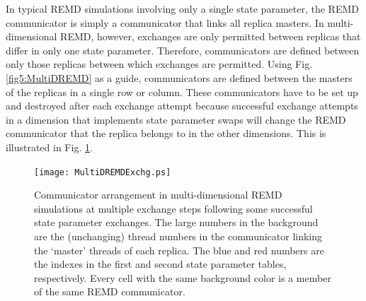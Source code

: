In typical REMD simulations involving only a single state parameter, the REMD
communicator is simply a communicator that links all replica masters. In
multi-dimensional REMD, however, exchanges are only permitted between replicas
that differ in only one state parameter. Therefore, communicators are defined
between only those replicas between which exchanges are permitted. Using Fig.
\ref{fig5:MultiDREMD} as a guide, communicators are defined between the masters
of the replicas in a single row or column. These communicators have to be set up
and destroyed after each exchange attempt because successful exchange attempts
in a dimension that implements state parameter swaps will change the REMD
communicator that the replica belongs to in the other dimensions. This is
illustrated in Fig. \ref{fig5:MultiDREMDExchg}.

\begin{figure}
   \texttt{[image: MultiDREMDExchg.ps]}
   \caption[Communicator arrangement in multi-dimensional REMD simulations at
            multiple exchange steps following some successful state parameter
            exchanges.]
           {Communicator arrangement in multi-dimensional REMD simulations at
            multiple exchange steps following some successful state parameter
            exchanges. The large numbers in the background are the (unchanging)
            thread numbers in the communicator linking the `master' threads of
            each replica. The blue and red numbers are the indexes in the first
            and second state parameter tables, respectively. Every cell with the
            same background color is a member of the same REMD communicator.}
   \label{fig5:MultiDREMDExchg}
\end{figure}
